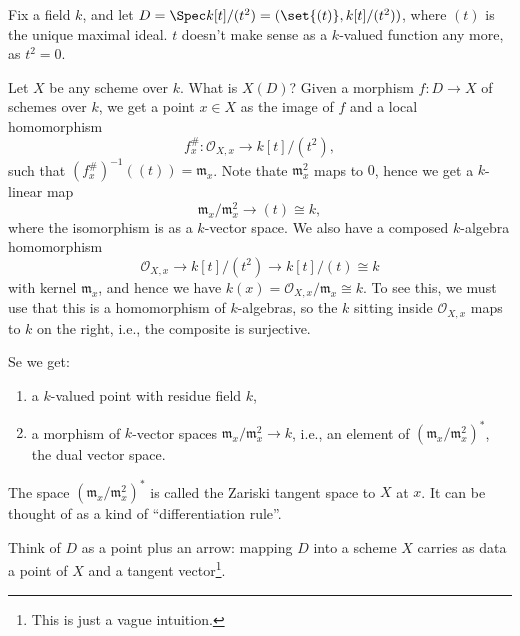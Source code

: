 Fix a field $k$, and let $D = \Spec k[t]/(t^2) = (\set{(t)}, k[t]/(t^2))$, where $(t)$ is
the unique maximal ideal.
$t$ doesn't make sense as a $k$-valued function any more, as $t^2 = 0$.

Let $X$ be any scheme over $k$. What is $X(D)$? Given a morphism $f\colon D\to X$
of schemes over $k$, we get a point $x \in X$ as the image of $f$ and a local
homomorphism
\[ f^\#_x\colon \mathcal{O}_{X, x}\to k[t]/(t^2), \]
such that $(f^\#_x)^{-1}((t)) = \mathfrak{m}_x$. Note thate $\mathfrak{m}_x^2$ maps
to $0$, hence we get a $k$-linear map
\[ \mathfrak{m}_x/\mathfrak{m}_x^2 \to (t)\cong k, \]
where the isomorphism is as a $k$-vector space. We also have a composed $k$-algebra
homomorphism
\[ \mathcal{O}_{X, x} \to k[t]/(t^2)\to k[t]/(t) \cong k \]
with kernel $\mathfrak{m}_x$, and hence we have $k(x) = \mathcal{O}_{X, x}/\mathfrak{m}_x \cong k$.
To see this, we must use that this is a homomorphism of $k$-algebras, so the $k$ sitting inside
$\mathcal{O}_{X, x}$ maps to $k$ on the right, i.e., the composite is surjective.

Se we get:
\begin{enumerate}
	\item a $k$-valued point with residue field $k$,
	\item a morphism of $k$-vector spaces $\mathfrak{m}_x/\mathfrak{m}_x^2\to k$,
		i.e., an element of $(\mathfrak{m}_x/\mathfrak{m}_x^2)^*$, the dual vector space.
\end{enumerate}

The space $(\mathfrak{m}_x/\mathfrak{m}_x^2)^*$ is called the Zariski tangent space
to $X$ at $x$. It can be thought of as a kind of \enquote{differentiation rule}.

Think of $D$ as a point plus an arrow: mapping $D$ into a scheme $X$ carries as
data a point of $X$ and a tangent vector\footnote{This is just a vague intuition.}.

